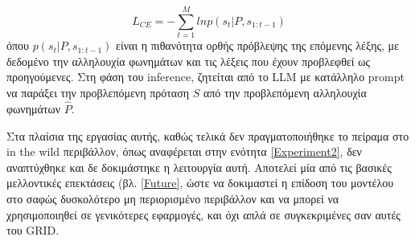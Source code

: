 \[
L_{CE} = - \sum_{t=1}^M ln p(s_t|P, s_{1:t-1})
\]
όπου $p(s_t|P, s_{1:t-1})$ είναι η πιθανότητα ορθής πρόβλεψης της επόμενης λέξης, με δεδομένο την αλληλουχία φωνημάτων και τις λέξεις που έχουν προβλεφθεί ως προηγούμενες. Στη φάση του inference, ζητείται από το LLM με κατάλληλο prompt να παράξει την προβλεπόμενη πρόταση $\hat S$ από την προβλεπόμενη αλληλουχία φωνημάτων $\hat P$.

Στα πλαίσια της εργασίας αυτής, καθώς τελικά δεν πραγματοποιήθηκε το πείραμα στο in the wild περιβάλλον, όπως αναφέρεται στην ενότητα \ref{Experiment2}, δεν αναπτύχθηκε και δε δοκιμάστηκε η λειτουργία αυτή. Αποτελεί μία από τις βασικές μελλοντικές επεκτάσεις (βλ. \ref{Future}, ώστε να δοκιμαστεί η επίδοση του μοντέλου στο σαφώς δυσκολότερο μη περιορισμένο περιβάλλον και να μπορεί να χρησιμοποιηθεί σε γενικότερες εφαρμογές, και όχι απλά σε συγκεκριμένες σαν αυτές του GRID.